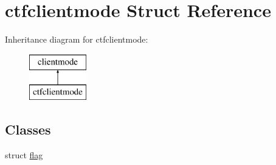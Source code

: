 \hypertarget{structctfclientmode}{}\section{ctfclientmode Struct Reference}
\label{structctfclientmode}
Inheritance diagram for ctfclientmode\+:\begin{figure}[H]
\begin{center}
\leavevmode
\includegraphics[height=2.000000cm]{structctfclientmode}
\end{center}
\end{figure}
\subsection*{Classes}
\begin{DoxyCompactItemize}
\item 
struct \hyperlink{structctfclientmode_1_1flag}{flag}
\end{DoxyCompactItemize}
